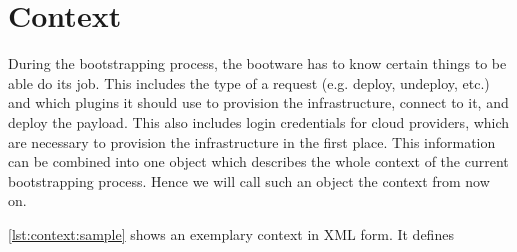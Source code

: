 \section{Context}
\label{context}

During the bootstrapping process, the bootware has to know certain things to be able do its job.
This includes the type of a request (e.g. deploy, undeploy, etc.) and which plugins it should use to provision the infrastructure, connect to it, and deploy the payload.
This also includes login credentials for cloud providers, which are necessary to provision the infrastructure in the first place.
This information can be combined into one object which describes the whole context of the current bootstrapping process.
Hence we will call such an object the context from now on.

\vspace{1em}

\autoref{lst:context:sample} shows an exemplary context in XML form.
It defines
